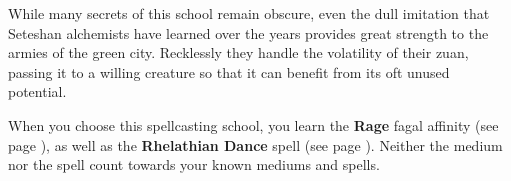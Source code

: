     While many secrets of this school remain obscure, even the dull imitation that Seteshan alchemists have learned over the years provides great strength to the armies of the green city.
    Recklessly they handle the volatility of their zuan, passing it to a willing creature so that it can benefit from its oft unused potential.

    When you choose this spellcasting school, you learn the \textbf{Rage} fagal affinity (see page \pageref{medium::rage}), as well as the \textbf{Rhelathian Dance} spell (see page \pageref{spell::rhelathiandance}).
    Neither the medium nor the spell count towards your known mediums and spells.

\newpage
